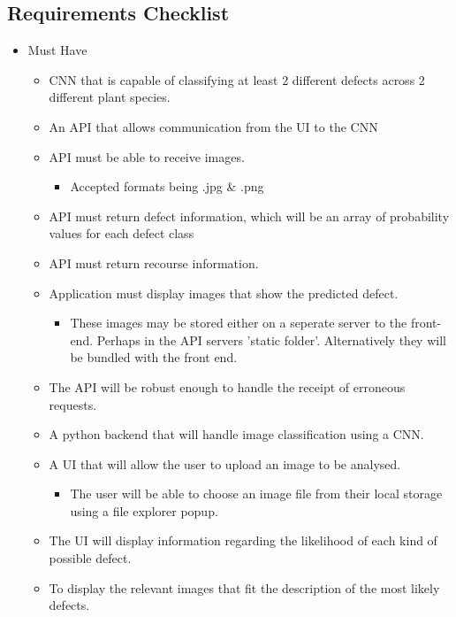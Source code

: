  \subsection{Requirements Checklist}
    \begin{itemize}
      \item Must Have
      \begin{itemize}
        \item CNN that is capable of classifying at least 2 different defects across 2 different plant species.\checkmark
        \item An API that allows communication from the UI to the CNN \checkmark
        \item API must be able to receive images. \checkmark
          \begin{itemize}
            \item Accepted formats being .jpg \& .png
          \end{itemize}
        \item API must return defect information, which will be an array of probability values for each defect class \checkmark
        \item API must return recourse information. \checkmark
        \item Application must display images that show the predicted defect. \checkmark
          \begin{itemize}
            \item These images may be stored either on a seperate server to the front-end. Perhaps in the API servers 'static folder'. Alternatively they will be bundled with the front end.
          \end{itemize}
      	\item The API will be robust enough to handle the receipt of erroneous requests. \checkmark
      	\item A python backend that will handle image classification using a CNN. \checkmark
      	\item A UI that will allow the user to upload an image to be analysed. \checkmark
        \begin{itemize}
          \item The user will be able to choose an image file from their local storage using a file explorer popup.
        \end{itemize}
      	\item The UI will display information regarding the likelihood of each kind of possible defect. \checkmark
      	\item To display the relevant images that fit the description of the most likely defects.\checkmark

\end{itemize}
\end{itemize}
